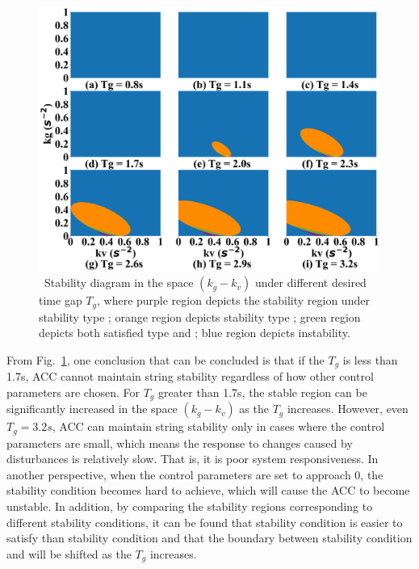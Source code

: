 \documentclass[a4paper]{cas-sc}
\begin{document}
\begin{figure}
  \centering
  \includegraphics[width=14cm]{figs/fig6.png}
  \caption{~Stability diagram in the space $(k_g-k_v)$ under different desired time gap $T_g$, where purple region depicts the stability region under stability type \uppercase\expandafter{}; orange region depicts stability type \uppercase\expandafter{}; green region depicts both satisfied type \uppercase\expandafter{} and \uppercase\expandafter{}; blue region depicts instability.}
  \label{fig6}
\end{figure}

From Fig.~\ref{fig6}, one conclusion that can be concluded is that if the $T_g$ is less than 1.7s, ACC cannot maintain string stability regardless of how other control parameters are chosen. For $T_g$ greater than 1.7s, the stable region can be significantly increased in the space $(k_g-k_v)$ as the $T_g$ increases. However, even $T_g = 3.2s$, ACC can maintain string stability only in cases where the control parameters are small, which means the response to changes caused by disturbances is relatively slow. That is, it is poor system responsiveness. In another perspective, when the control parameters are set to approach 0, the stability condition \uppercase\expandafter{} becomes hard to achieve, which will cause the ACC to become unstable. In addition, by comparing the stability regions corresponding to different stability conditions, it can be found that stability condition \uppercase\expandafter{} is easier to satisfy than stability condition \uppercase\expandafter{} and that the boundary between stability condition \uppercase\expandafter{} and \uppercase\expandafter{} will be shifted as the $T_g$ increases.
\end{document}
